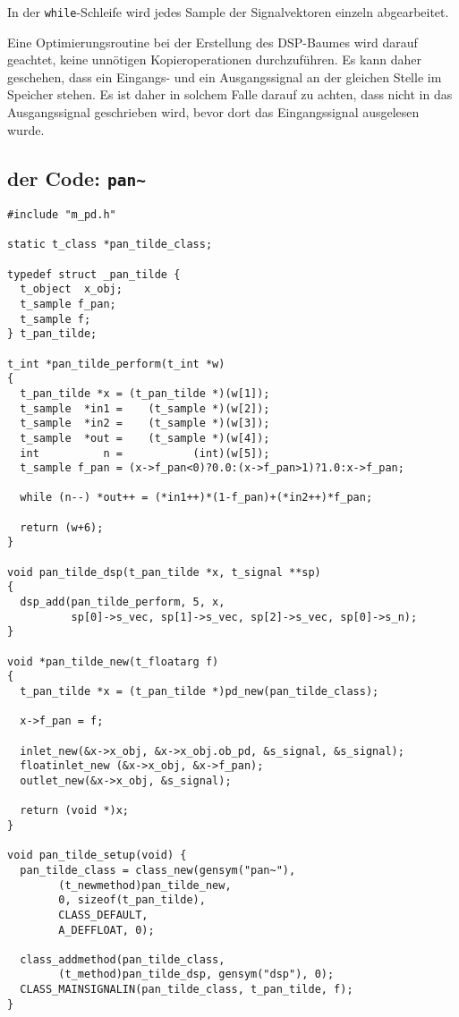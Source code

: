 \documentclass[12pt, a4paper,austrian, titlepage]{article}
\begin{document}
In der \verb+while+-Schleife wird jedes Sample der Signalvektoren einzeln
abgearbeitet.

Eine Optimierungsroutine bei der Erstellung des DSP-Baumes wird darauf geachtet,
keine unnötigen Kopieroperationen durchzuführen.
Es kann daher geschehen, dass ein Eingangs- und ein Ausgangssignal an der
gleichen Stelle im Speicher stehen.
Es ist daher in solchem Falle darauf zu achten,
dass nicht in das Ausgangssignal geschrieben wird,
bevor dort das Eingangssignal ausgelesen wurde.

\subsection{der Code: \tt pan\~\/}

\begin{verbatim}
#include "m_pd.h"

static t_class *pan_tilde_class;

typedef struct _pan_tilde {
  t_object  x_obj;
  t_sample f_pan;
  t_sample f;
} t_pan_tilde;

t_int *pan_tilde_perform(t_int *w)
{
  t_pan_tilde *x = (t_pan_tilde *)(w[1]);
  t_sample  *in1 =    (t_sample *)(w[2]);
  t_sample  *in2 =    (t_sample *)(w[3]);
  t_sample  *out =    (t_sample *)(w[4]);
  int          n =           (int)(w[5]);
  t_sample f_pan = (x->f_pan<0)?0.0:(x->f_pan>1)?1.0:x->f_pan;

  while (n--) *out++ = (*in1++)*(1-f_pan)+(*in2++)*f_pan;

  return (w+6);
}

void pan_tilde_dsp(t_pan_tilde *x, t_signal **sp)
{
  dsp_add(pan_tilde_perform, 5, x,
          sp[0]->s_vec, sp[1]->s_vec, sp[2]->s_vec, sp[0]->s_n);
}

void *pan_tilde_new(t_floatarg f)
{
  t_pan_tilde *x = (t_pan_tilde *)pd_new(pan_tilde_class);

  x->f_pan = f;
  
  inlet_new(&x->x_obj, &x->x_obj.ob_pd, &s_signal, &s_signal);
  floatinlet_new (&x->x_obj, &x->f_pan);
  outlet_new(&x->x_obj, &s_signal);

  return (void *)x;
}

void pan_tilde_setup(void) {
  pan_tilde_class = class_new(gensym("pan~"),
        (t_newmethod)pan_tilde_new,
        0, sizeof(t_pan_tilde),
        CLASS_DEFAULT, 
        A_DEFFLOAT, 0);

  class_addmethod(pan_tilde_class,
        (t_method)pan_tilde_dsp, gensym("dsp"), 0);
  CLASS_MAINSIGNALIN(pan_tilde_class, t_pan_tilde, f);
}
\end{verbatim}
\end{document}
